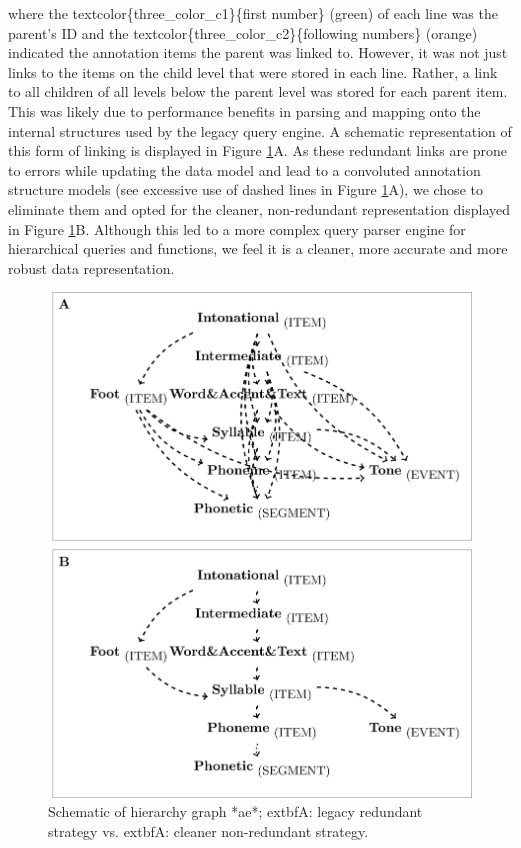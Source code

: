 \documentclass[]{book}
\begin{document}
where the textcolor\{three\_color\_c1\}\{first number\} (green) of each line was the parent's ID and the textcolor\{three\_color\_c2\}\{following numbers\} (orange) indicated the annotation items the parent was linked to. However, it was not just links to the items on the child level that were stored in each line. Rather, a link to all children of all levels below the parent level was stored for each parent item. This was likely due to performance benefits in parsing and mapping onto the internal structures used by the legacy query engine. A schematic representation of this form of linking is displayed in Figure \ref{fig:query-redundant}A. As these redundant links are prone to errors while updating the data model and lead to a convoluted annotation structure models (see excessive use of dashed lines in Figure \ref{fig:query-redundant}A), we chose to eliminate them and opted for the cleaner, non-redundant representation displayed in Figure \ref{fig:query-redundant}B. Although this led to a more complex query parser engine for hierarchical queries and functions, we feel it is a cleaner, more accurate and more robust data representation.

\begin{figure}

{\centering \includegraphics[width=0.75\linewidth]{pics/aeGraph_redundant} 

}

\caption{Schematic of hierarchy graph *ae*;     extbf{A}: legacy redundant strategy vs.     extbf{A}: cleaner non-redundant strategy.}\label{fig:query-redundant}
\end{figure}
\end{document}
